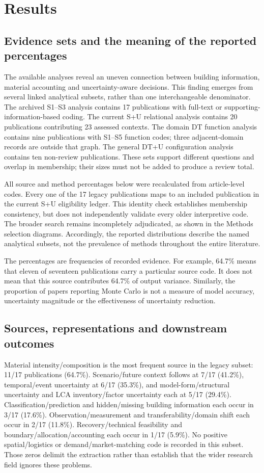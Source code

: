 \section{Results}
\subsection{Evidence sets and the meaning of the reported percentages}
The available analyses reveal an uneven connection between building information, material accounting and uncertainty-aware decisions. This finding emerges from several linked analytical subsets, rather than one interchangeable denominator. The archived S1–S3 analysis contains 17 publications with full-text or supporting-information-based coding. The current S+U relational analysis contains 20 publications contributing 23 assessed contexts. The domain DT function analysis contains nine publications with S1–S5 function codes; three adjacent-domain records are outside that graph. The general DT+U configuration analysis contains ten non-review publications. These sets support different questions and overlap in membership; their sizes must not be added to produce a review total.

All source and method percentages below were recalculated from article-level codes. Every one of the 17 legacy publications maps to an included publication in the current S+U eligibility ledger. This identity check establishes membership consistency, but does not independently validate every older interpretive code. The broader search remains incompletely adjudicated, as shown in the Methods selection diagrams. Accordingly, the reported distributions describe the named analytical subsets, not the prevalence of methods throughout the entire literature.

The percentages are frequencies of recorded evidence. For example, 64.7\% means that eleven of seventeen publications carry a particular source code. It does not mean that this source contributes 64.7\% of output variance. Similarly, the proportion of papers reporting Monte Carlo is not a measure of model accuracy, uncertainty magnitude or the effectiveness of uncertainty reduction.

\subsection{Sources, representations and downstream outcomes}
Material intensity/composition is the most frequent source in the legacy subset: 11/17 publications (64.7\%). Scenario/future context follows at 7/17 (41.2\%), temporal/event uncertainty at 6/17 (35.3\%), and model-form/structural uncertainty and LCA inventory/factor uncertainty each at 5/17 (29.4\%). Classification/prediction and hidden/missing building information each occur in 3/17 (17.6\%). Observation/measurement and transferability/domain shift each occur in 2/17 (11.8\%). Recovery/technical feasibility and boundary/allocation/accounting each occur in 1/17 (5.9\%). No positive spatial/logistics or demand/market-matching code is recorded in this subset. Those zeros delimit the extraction rather than establish that the wider research field ignores these problems.

